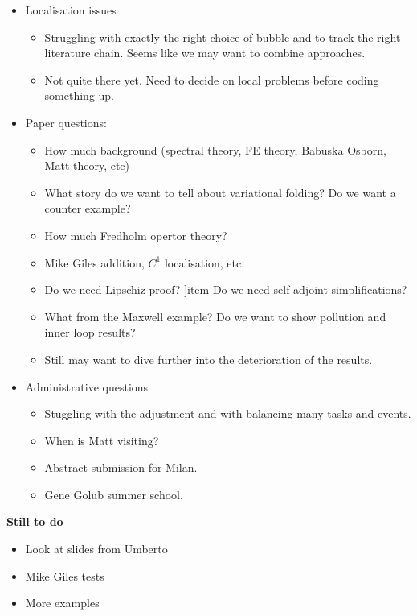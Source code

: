 \documentclass[12pt,a4paper]{article}
\begin{document}
\begin{itemize}
    \item Localisation issues
    \begin{itemize}
        \item Struggling with exactly the right choice of bubble and to track the right literature chain. Seems like we may want to combine approaches. 
        \item Not quite there yet. Need to decide on local problems before coding something up. 
    \end{itemize}
    \item Paper questions:
    \begin{itemize}
        \item How much background (spectral theory, FE theory, Babuska Osborn, Matt theory, etc)
        \item What story do we want to tell about variational folding? Do we want a counter example? 
        \item How much Fredholm opertor theory?
        \item Mike Giles addition, $C^1$ localisation, etc.
        \item Do we need Lipschiz proof? 
        ]item Do we need self-adjoint simplifications?
        \item What from the Maxwell example? Do we want to show pollution and inner loop results? 
        \item Still may want to dive further into the deterioration of the results. 
    \end{itemize}
    \item Administrative questions
    \begin{itemize}
    \item Stuggling with the adjustment and with balancing many tasks and events. 
    \item When is Matt visiting?
    \item Abstract submission  for Milan.
    \item Gene Golub summer school. 
\end{itemize}
\end{itemize}

\textbf{Still to do}

\begin{itemize}
    \item Look at slides from Umberto
    \item Mike Giles tests
    \item More examples
\end{itemize}
\end{document}
